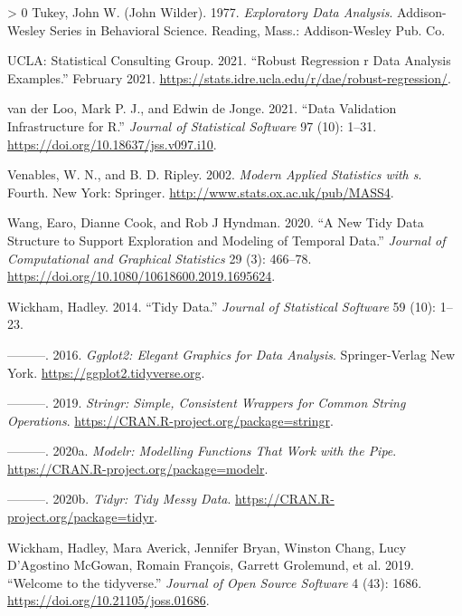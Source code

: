 \documentclass[12pt]{article}
\newlength{\cslhangindent}
\newenvironment{CSLReferences}[3] %
 {%
  \setlength{\parindent}{0pt}
  \ifodd #1 \everypar{\setlength{\hangindent}{\cslhangindent}}\ignorespaces\fi
  \ifnum #2 > 0
  \setlength{\parskip}{#2\baselineskip}
  \fi
 }%
 {}
\begin{document}
\begin{CSLReferences}{1}{0}
\leavevmode\hypertarget{ref-tukey}{}%
Tukey, John W. (John Wilder). 1977. \emph{Exploratory Data Analysis}. Addison-Wesley Series in Behavioral Science. Reading, Mass.: Addison-Wesley Pub. Co.

\leavevmode\hypertarget{ref-rlm}{}%
UCLA: Statistical Consulting Group. 2021. {``Robust Regression \textbar{} r Data Analysis Examples.''} February 2021. \url{https://stats.idre.ucla.edu/r/dae/robust-regression/}.

\leavevmode\hypertarget{ref-validate}{}%
van der Loo, Mark P. J., and Edwin de Jonge. 2021. {``Data Validation Infrastructure for {R}.''} \emph{Journal of Statistical Software} 97 (10): 1--31. \url{https://doi.org/10.18637/jss.v097.i10}.

\leavevmode\hypertarget{ref-mass}{}%
Venables, W. N., and B. D. Ripley. 2002. \emph{Modern Applied Statistics with s}. Fourth. New York: Springer. \url{http://www.stats.ox.ac.uk/pub/MASS4}.

\leavevmode\hypertarget{ref-tsibble}{}%
Wang, Earo, Dianne Cook, and Rob J Hyndman. 2020. {``A New Tidy Data Structure to Support Exploration and Modeling of Temporal Data.''} \emph{Journal of Computational and Graphical Statistics} 29 (3): 466--78. \url{https://doi.org/10.1080/10618600.2019.1695624}.

\leavevmode\hypertarget{ref-WickhamHadley2014TD}{}%
Wickham, Hadley. 2014. {``Tidy Data.''} \emph{Journal of Statistical Software} 59 (10): 1--23.

\leavevmode\hypertarget{ref-ggplot2}{}%
---------. 2016. \emph{Ggplot2: Elegant Graphics for Data Analysis}. Springer-Verlag New York. \url{https://ggplot2.tidyverse.org}.

\leavevmode\hypertarget{ref-stringr}{}%
---------. 2019. \emph{Stringr: Simple, Consistent Wrappers for Common String Operations}. \url{https://CRAN.R-project.org/package=stringr}.

\leavevmode\hypertarget{ref-modelr}{}%
---------. 2020a. \emph{Modelr: Modelling Functions That Work with the Pipe}. \url{https://CRAN.R-project.org/package=modelr}.

\leavevmode\hypertarget{ref-tidyr}{}%
---------. 2020b. \emph{Tidyr: Tidy Messy Data}. \url{https://CRAN.R-project.org/package=tidyr}.

\leavevmode\hypertarget{ref-tidyverse}{}%
Wickham, Hadley, Mara Averick, Jennifer Bryan, Winston Chang, Lucy D'Agostino McGowan, Romain François, Garrett Grolemund, et al. 2019. {``Welcome to the {tidyverse}.''} \emph{Journal of Open Source Software} 4 (43): 1686. \url{https://doi.org/10.21105/joss.01686}.


\end{CSLReferences}
\end{document}
